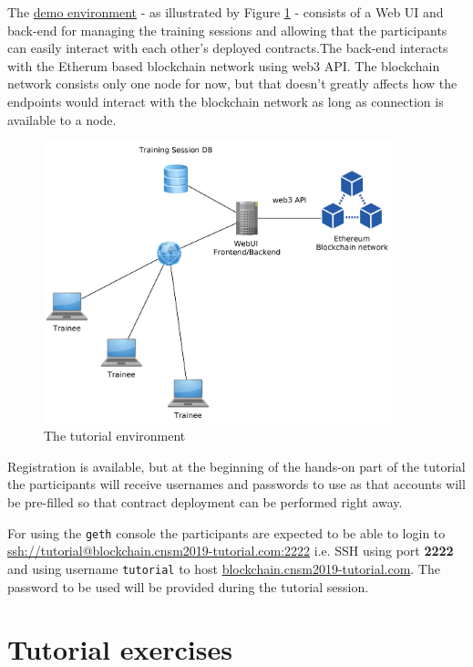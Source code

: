 \documentclass[a4paper]{article}
\begin{document}
The \href{https://blockchain.cnsm2019-tutorial.com/}{demo environment} - as illustrated by Figure \ref{fig:demo-env} - consists of a Web UI and back-end for managing the training sessions and allowing that the participants can easily interact with each other's deployed contracts.The back-end interacts with the Etherum based blockchain network using web3 API. The blockchain network consists only one node for now, but that doesn't greatly affects how the endpoints would interact with the blockchain network as long as connection is available to a node.

\begin{figure}[H]
    \centering
    \includegraphics[width=0.9\textwidth]{figures/env.png}
    \caption{The tutorial environment}
    \label{fig:demo-env}
\end{figure}

Registration is available, but at the beginning of the hands-on part of the tutorial the participants will receive usernames and passwords to use as that accounts will be pre-filled so that contract deployment can be performed right away.

For using the \texttt{geth} console the participants are expected to be able to login to \url{ssh://tutorial@blockchain.cnsm2019-tutorial.com:2222} i.e. SSH using port \textbf{2222} and using username \texttt{tutorial} to host \url{blockchain.cnsm2019-tutorial.com}. The password to be used will be provided during the tutorial session.

\section{Tutorial exercises}
\end{document}
